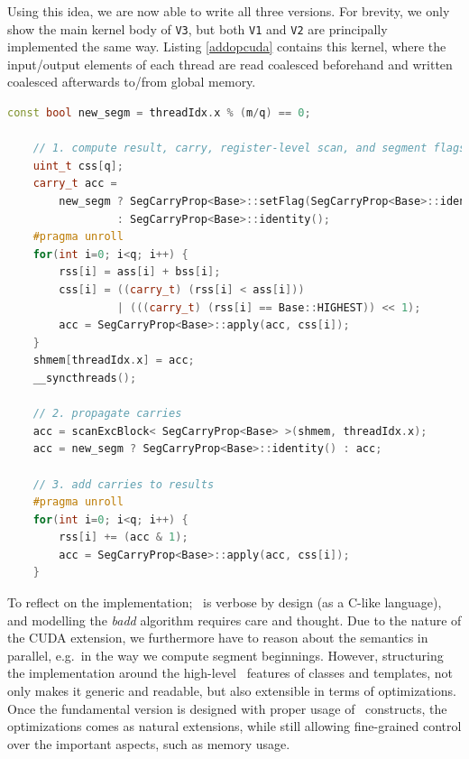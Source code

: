 Using this idea, we are now able to write all three versions. For brevity, we
only show the main kernel body of \texttt{V3}, but both \texttt{V1} and
\texttt{V2} are principally implemented the same way. Listing \ref{addopcuda}
contains this kernel, where the input/output elements of each thread are read
coalesced beforehand and written coalesced afterwards to/from global memory.
\begin{lstlisting}[language=CPP,caption={\footnotesize
  CUDA \textit{badd} \texttt{V3} implementation body from file
  \texttt{ker-add.cu.h} (slightly edited), where registers \texttt{ass}, \texttt{bss}, and
  \texttt{rss} contains $q$ input/output digits, respectively, of type
  \texttt{uint\_t} with base class \texttt{Base}, segmented scan operator class
  \texttt{SegCarryProp} over carry type \texttt{carry\_t}, and shared memory
  buffer
  \texttt{shmem}.},label={addopcuda},firstnumber=212,gobble=4]
    const bool new_segm = threadIdx.x % (m/q) == 0;

    // 1. compute result, carry, register-level scan, and segment flags
    uint_t css[q];
    carry_t acc =
        new_segm ? SegCarryProp<Base>::setFlag(SegCarryProp<Base>::identity())
                 : SegCarryProp<Base>::identity();
    #pragma unroll
    for(int i=0; i<q; i++) {
        rss[i] = ass[i] + bss[i];
        css[i] = ((carry_t) (rss[i] < ass[i]))
                 | (((carry_t) (rss[i] == Base::HIGHEST)) << 1);
        acc = SegCarryProp<Base>::apply(acc, css[i]);
    }
    shmem[threadIdx.x] = acc;
    __syncthreads();

    // 2. propagate carries
    acc = scanExcBlock< SegCarryProp<Base> >(shmem, threadIdx.x);
    acc = new_segm ? SegCarryProp<Base>::identity() : acc;

    // 3. add carries to results
    #pragma unroll
    for(int i=0; i<q; i++) {
        rss[i] += (acc & 1);
        acc = SegCarryProp<Base>::apply(acc, css[i]);
    }
\end{lstlisting}

To reflect on the implementation; \cpp\ is verbose by design (as a C-like
language), and modelling the \textit{badd} algorithm requires care and
thought. Due to the nature of the CUDA extension, we furthermore have to reason
about the semantics in parallel, e.g.\ in the way we compute segment
beginnings. However, structuring the implementation around the high-level \cpp\
features of classes and templates, not only makes it generic and readable, but
also extensible in terms of optimizations. Once the fundamental version is
designed with proper usage of \cpp\ constructs, the optimizations comes as
natural extensions, while still allowing fine-grained control over the important
aspects, such as memory usage.

